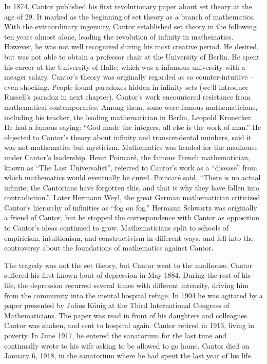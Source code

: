 \documentclass{article}
\begin{document}
In 1874, Cantor published his first revolutionary paper about set theory at the age of 29. It marked as the beginning of set theory as a branch of mathematics. With the extraordinary ingenuity, Cantor established set theory in the following ten years almost alone, leading the revolution of infinity in mathematics. However, he was not well recognized during his most creative period. He desired, but was not able to obtain a professor chair at the University of Berlin. He spent his career at the University of Halle, which was a infamous university with a meager salary. Cantor's theory was originally regarded as so counter-intuitive – even shocking. People found paradoxes hidden in infinity sets (we'll introduce Russell's paradox in next chapter). Cantor's work encountered resistance from mathematical contemporaries. Among them, some were famous mathematicians, including his teacher, the leading mathematician in Berlin, Leopold Kronecker. He had a famous saying: ``God made the integers, all else is the work of man.'' He objected to Cantor's theory about infinity and transcendental numbers, said it was not mathematics but mysticism. Mathematics was headed for the madhouse under Cantor's leadership. Henri Poincaré, the famous French mathematician, known as ``The Last Universalist'', referred to Cantor's work as a ``disease'' from which mathematics would eventually be cured. Poincaré said, ``There is no actual infinite; the Cantorians have forgotten this, and that is why they have fallen into contradiction.''. Later Hermann Weyl, the great German mathematician criticized Cantor's hierarchy of infinities as ``fog on fog.'' Hermann Schwartz was originally a friend of Cantor, but he stopped the correspondence with Cantor as opposition to Cantor's ideas continued to grow. Mathematicians split to schools of empiricism, intuitionism, and constructivism in different ways, and fell into the controversy about the foundations of mathematics against Cantor.

The tragedy was not the set theory, but Cantor went to the madhouse. Cantor suffered his first known bout of depression in May 1884. During the rest of his life, the depression recurred several times with different intensity, driving him from the community into the mental hospital refuge. In 1904 he was agitated by a paper presented by Julius König at the Third International Congress of Mathematicians. The paper was read in front of his daughters and colleagues. Cantor was shaken, and sent to hospital again. Cantor retired in 1913, living in poverty. In June 1917, he entered the sanatorium for the last time and continually wrote to his wife asking to be allowed to go home. Cantor died on January 6, 1918, in the sanatorium where he had spent the last year of his life.
\end{document}
